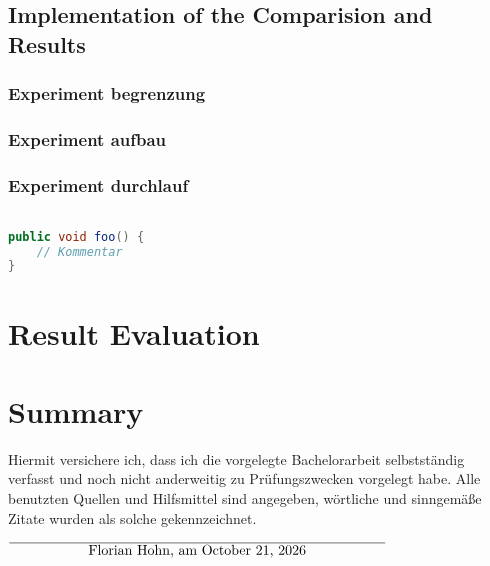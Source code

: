 \documentclass[12pt,oneside,a4paper,parskip]{scrbook}
\def\BaAuthor{Florian Hohn}
\begin{document}
\section{Implementation of the Comparision and Results}

\subsection{Experiment begrenzung}

\subsection{Experiment aufbau}

\subsection{Experiment durchlauf}

\begin{lstlisting}[label=lst:java,
				   language=java,
				   firstnumber=1,
				   caption=Beispiel für einen Quelltext]				   

public void foo() {				   
	// Kommentar
}
\end{lstlisting}


\chapter{Result Evaluation}

\chapter{Summary}

\backmatter

\printacronyms[include-classes=abbrev,name=Abbreviations]


\listoffigures
{}			

\listoftables



\printbibliography
{}				



Hiermit versichere ich, dass ich die vorgelegte Bachelorarbeit selbstständig verfasst und noch nicht anderweitig zu Prüfungszwecken vorgelegt habe. Alle benutzten Quellen und Hilfsmittel sind angegeben, wörtliche und sinngemäße Zitate wurden als solche gekennzeichnet.

\vspace{20pt}
\begin{flushright}
$\overline{~~~~~~~~~~~~~~~~~\mbox{\BaAuthor, am \today}~~~~~~~~~~~~~~~~~}$
\end{flushright}
\end{document}
